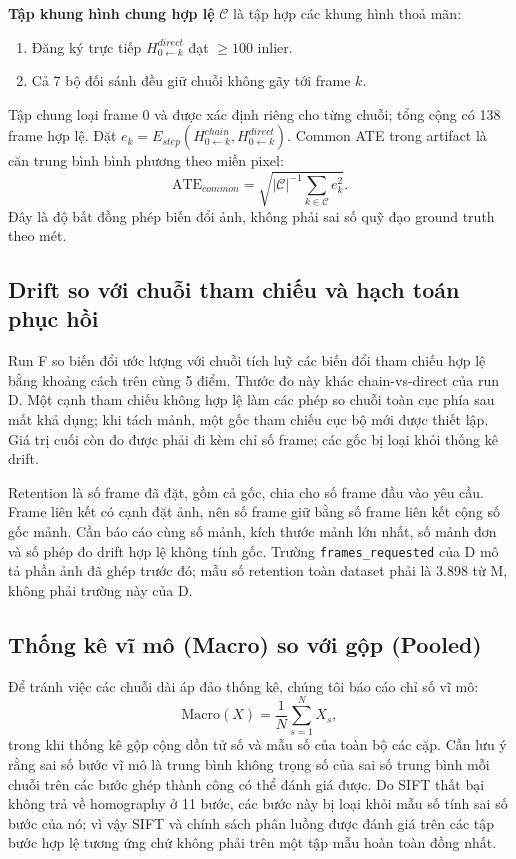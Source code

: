 \documentclass[conference]{IEEEtran}
\begin{document}
\textbf{Tập khung hình chung hợp lệ} $\mathcal{C}$ là tập hợp các khung hình thoả mãn:
\begin{enumerate}
    \item Đăng ký trực tiếp $H_{0 \leftarrow k}^{direct}$ đạt $\ge 100$ inlier.
    \item Cả 7 bộ đối sánh đều giữ chuỗi không gãy tới frame $k$.
\end{enumerate}
Tập chung loại frame 0 và được xác định riêng cho từng chuỗi; tổng cộng có 138 frame hợp lệ. Đặt $e_k=E_{step}(H_{0\leftarrow k}^{chain},H_{0\leftarrow k}^{direct})$. Common ATE trong artifact là căn trung bình bình phương theo miền pixel:
\begin{equation}
\text{ATE}_{common}=\sqrt{|\mathcal{C}|^{-1}\sum_{k\in\mathcal{C}}e_k^2}.
\label{eq:common_ate_vi}
\end{equation}
Đây là độ bất đồng phép biến đổi ảnh, không phải sai số quỹ đạo ground truth theo mét.

\subsection{Drift so với chuỗi tham chiếu và hạch toán phục hồi}
Run F so biến đổi ước lượng với chuỗi tích luỹ các biến đổi tham chiếu hợp lệ bằng khoảng cách trên cùng 5 điểm. Thước đo này khác chain-vs-direct của run D. Một cạnh tham chiếu không hợp lệ làm các phép so chuỗi toàn cục phía sau mất khả dụng; khi tách mảnh, một gốc tham chiếu cục bộ mới được thiết lập. Giá trị cuối còn đo được phải đi kèm chỉ số frame; các gốc bị loại khỏi thống kê drift.

Retention là số frame đã đặt, gồm cả gốc, chia cho số frame đầu vào yêu cầu. Frame liên kết có cạnh đặt ảnh, nên số frame giữ bằng số frame liên kết cộng số gốc mảnh. Cần báo cáo cùng số mảnh, kích thước mảnh lớn nhất, số mảnh đơn và số phép đo drift hợp lệ không tính gốc. Trường \texttt{frames\_requested} của D mô tả phần ảnh đã ghép trước đó; mẫu số retention toàn dataset phải là 3.898 từ M, không phải trường này của D.

\subsection{Thống kê vĩ mô (Macro) so với gộp (Pooled)}
\label{subsec:metric_aggregation}

Để tránh việc các chuỗi dài áp đảo thống kê, chúng tôi báo cáo chỉ số vĩ mô:
\begin{equation}
\text{Macro}(X) = \frac{1}{N} \sum_{s=1}^N X_s,
\label{eq:macro_mean_vi}
\end{equation}
trong khi thống kê gộp cộng dồn tử số và mẫu số của toàn bộ các cặp. Cần lưu ý rằng sai số bước vĩ mô là trung bình không trọng số của sai số trung bình mỗi chuỗi trên các bước ghép thành công có thể đánh giá được. Do SIFT thất bại không trả về homography ở 11 bước, các bước này bị loại khỏi mẫu số tính sai số bước của nó; vì vậy SIFT và chính sách phân luồng được đánh giá trên các tập bước hợp lệ tương ứng chứ không phải trên một tập mẫu hoàn toàn đồng nhất.
\end{document}
